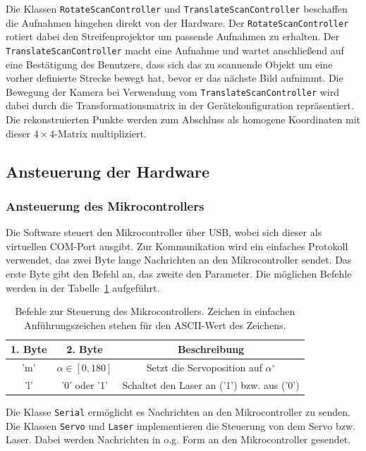 \documentclass[ngerman,a4paper,parskip=half]{scrartcl}
\begin{document}
Die Klassen \texttt{RotateScanController} und \texttt{TranslateScanController} beschaffen die Aufnahmen hingehen direkt von der Hardware. Der \texttt{RotateScanController} rotiert dabei den Streifenprojektor um passende Aufnahmen zu erhalten. Der \texttt{TranslateScanController} macht eine Aufnahme und wartet anschließend auf eine Bestätigung des Benutzers, dass sich das zu scannende Objekt um eine vorher definierte Strecke bewegt hat, bevor er das nächste Bild aufnimmt.
Die Bewegung der Kamera bei Verwendung vom \texttt{TranslateScanController} wird dabei durch die Transformationsmatrix in der Gerätekonfiguration repräsentiert. Die rekonstruierten Punkte werden zum Abschluss als homogene Koordinaten mit dieser $4 \times 4$-Matrix multipliziert.

\subsection{Ansteuerung der Hardware}

\subsubsection{Ansteuerung des Mikrocontrollers}

Die Software steuert den Mikrocontroller über USB, wobei sich dieser als virtuellen COM-Port ausgibt. Zur Kommunikation wird ein einfaches Protokoll verwendet, das zwei Byte lange Nachrichten an den Mikrocontroller sendet. Das erste Byte gibt den Befehl an, das zweite den Parameter. Die möglichen Befehle werden in der Tabelle~\ref{tab:protocol} aufgeführt.

\begin{table}
	\centering
	\begin{tabular}{|c|c|c|}
		\hline
		\bfseries 1. Byte & \bfseries 2. Byte & \bfseries Beschreibung \\
		\hline
		'm' & $\alpha \in [0,180]$ & Setzt die Servoposition auf $\alpha^\circ$\\
		\hline
		'l' & '0' oder '1' & Schaltet den Laser an ('1') bzw. aus ('0')\\
		\hline
	\end{tabular}
	\caption{Befehle zur Steuerung des Mikrocontrollers. Zeichen in einfachen Anführungszeichen stehen für den ASCII-Wert des Zeichens.}
	\label{tab:protocol}
\end{table}

Die Klasse \texttt{Serial} ermöglicht es Nachrichten an den Mikrocontroller zu senden. Die Klassen \texttt{Servo} und \texttt{Laser} implementieren die Steuerung von dem Servo bzw. Laser. Dabei werden Nachrichten in o.g. Form an den Mikrocontroller gesendet.
\end{document}

